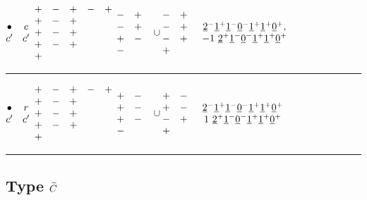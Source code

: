 \documentclass[11pt ,reqno]{amsart}
\begin{document}
\medskip
$\mat \bullet&c\\ c'&c'\emat$\qquad  
$\mat +&-&+&-&+\\ +&-&+&&\\+&-&+&&\\+&-&+&&\\+&&&&\emat$
\qquad $\mat -&+\\-&+\\+&-\\-&&\emat\cup\mat -&+\\-&+\\-&+\\+&&\emat$
\qquad $\mat\ul{2}^-\ul{1}^+\ul{1}^-\ul{0}^-\ul{1}^+\ul{1}^+\ul{0}^+,\\
-1\ \ul{2}^+\ul{1}^-\ul{0}^-\ul{1}^+\ul{1}^+\ul{0}^+\emat$
\hfill
\medskip
\hrule
\medskip
$\mat \bullet&r\\ c'&c'\emat$\qquad  
$\mat +&-&+&-&+\\ +&-&+&&\\+&-&+&&\\+&-&+&&\\+&&&&\emat$
\qquad $\mat +&-\\+&-\\+&-\\-&&\emat\cup\mat +&-\\+&-\\-&+\\+&&\emat$
\qquad $\mat\ul{2}^-\ul{1}^+\ul{1}^-\ul{0}^-\ul{1}^+\ul{1}^+\ul{0}^+\\ 
1\ \ul{2}^+\ul{1}^-\ul{0}^-\ul{1}^+\ul{1}^+\ul{0}^+\emat$
\hfill
\medskip
\hrule
\newpage
\subsection{Type $\wti{C}$}
\end{document}
